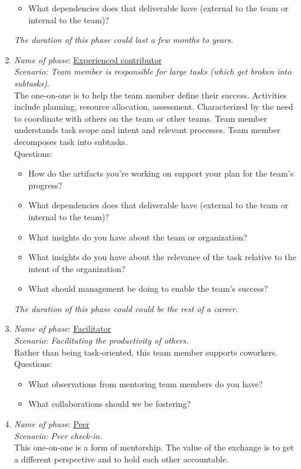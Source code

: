 \begin{enumerate}
\begin{itemize}
        \item What dependencies does that deliverable have (external to the team or internal to the team)?
    \end{itemize}
\textit{The duration of this phase could last a few months to years.}
    \item \textit{Name of phase}: \underline{Experienced contributor}\\
    \textit{Scenario: Team member is responsible for large tasks (which get broken into subtasks). }\\
    The one-on-one is to help the team member define their success. Activities include planning, resource allocation, assessment. Characterized by the need to coordinate with others on the team or other teams. Team member understands task scope and intent and relevant processes. Team member decomposes task into subtasks.\\
    Questions:
    \begin{itemize}
        \item How do the artifacts you're working on support your plan for the team's progress?
        \item What dependencies does that deliverable have (external to the team or internal to the team)?
        \item What insights do you have about the team or organization?
        \item What insights do you have about the relevance of the task relative to the intent of the organization?
        \item What should management be doing to enable the team's success?
    \end{itemize}
\textit{The duration of this phase could could be the rest of a career.}
    \item \textit{Name of phase}: \underline{Facilitator}\\
    \textit{Scenario: Facilitating the productivity of others.}\\
    Rather than being task-oriented, this team member supports coworkers. \\
    Questions:
    \begin{itemize}
        \item What observations from mentoring team members do you have?
        \item What collaborations should we be fostering?
    \end{itemize}
    \item \textit{Name of phase}: \underline{Peer}\\
    \textit{Scenario: Peer check-in.}\\ 
    This one-on-one is a form of mentorship. The value of the exchange is to get a different perspective and to hold each other accountable.
\end{enumerate}

